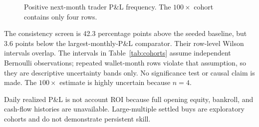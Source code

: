 \documentclass[conference]{IEEEtran}
\begin{document}
\begin{figure}[t]
\centering
{}
\caption{Positive next-month trader P\&L frequency. The $100\times$ cohort contains only four rows.}
\label{fig:rates}
\end{figure}

The consistency screen is 42.3 percentage points above the seeded baseline, but 3.6 points below the largest-monthly-P\&L comparator. Their row-level Wilson intervals overlap. The intervals in Table~\ref{tab:cohorts} assume independent Bernoulli observations; repeated wallet-month rows violate that assumption, so they are descriptive uncertainty bands only. No significance test or causal claim is made. The $100\times$ estimate is highly uncertain because $n=4$.

Daily realized P\&L is not account ROI because full opening equity, bankroll, and cash-flow histories are unavailable. Large-multiple settled buys are exploratory cohorts and do not demonstrate persistent skill.
\end{document}
